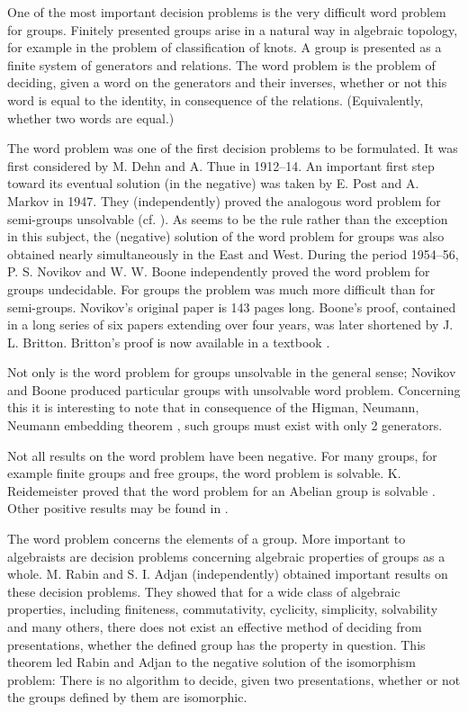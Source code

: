 \documentclass[11pt]{article}
\newcommand{\origpage}[1]{\marginnote{\footnotesize\textbf{[#1]}}}
\begin{document}
One of the most important decision problems is the very difficult word problem for groups. Finitely presented groups arise in a natural way in algebraic topology, for example in the problem of classification of knots. A group is presented as a finite system of generators and relations. The word problem is the problem of deciding, given a word on the generators and their inverses, whether or not this word is equal to the identity, in consequence of the relations. (Equivalently, whether two words are equal.)

The word problem was one of the first decision problems to be formulated. It was first considered by M. Dehn and A. Thue in 1912--14. An important first step toward
\origpage{726}its eventual solution (in the negative) was taken by E. Post and A. Markov in 1947. They (independently) proved the analogous word problem for semi-groups unsolvable (cf. \cite[Chap.~6]{r8}). As seems to be the rule rather than the exception in this subject, the (negative) solution of the word problem for groups was also obtained nearly simultaneously in the East and West. During the period 1954--56, P. S. Novikov and W. W. Boone independently proved the word problem for groups undecidable. For groups the problem was much more difficult than for semi-groups. Novikov's original paper \cite{r27} is 143 pages long. Boone's proof, contained in a long series of six papers extending over four years, was later shortened by J. L. Britton. Britton's proof is now available in a textbook \cite{r39}.

Not only is the word problem for groups unsolvable in the general sense; Novikov and Boone produced particular groups with unsolvable word problem. Concerning this it is interesting to note that in consequence of the Higman, Neumann, Neumann embedding theorem \cite{r15}, such groups must exist with only 2 generators.

Not all results on the word problem have been negative. For many groups, for example finite groups and free groups, the word problem is solvable. K. Reidemeister proved that the word problem for an Abelian group is solvable \cite{r33}. Other positive results may be found in \cite{r20}.

The word problem concerns the elements of a group. More important to algebraists are decision problems concerning algebraic properties of groups as a whole. M. Rabin \cite{r31} and S. I. Adjan \cite{r1} (independently) obtained important results on these decision problems. They showed that for a wide class of algebraic properties, including finiteness, commutativity, cyclicity, simplicity, solvability and many others, there does not exist an effective method of deciding from presentations, whether the defined group has the property in question. This theorem led Rabin and Adjan to the negative solution of the isomorphism problem: There is no algorithm to decide, given two presentations, whether or not the groups defined by them are isomorphic.
\end{document}
